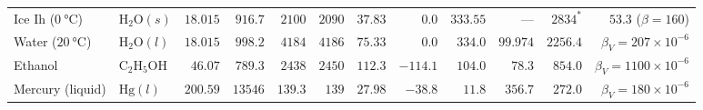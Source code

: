\documentclass[10pt,twoside,openany,letterpaper]{book}
\begin{document}
\begin{quicksheet}
\begin{formulacard}
\begin{tabularx}{\linewidth}{@{}X l r r r r r r r r r r@{}}
Ice Ih ($\SI{0}{\celsius}$) & $\mathrm{H_2O}(s)$ & $18.015$ & $916.7$ & $2100$ & $2090$ & $37.83$ & $0.0$ & $333.55$ & — & $2834^*$ & $53.3$ ($\beta=160$) \\
Water ($\SI{20}{\celsius}$) & $\mathrm{H_2O}(l)$ & $18.015$ & $998.2$ & $4184$ & $4186$ & $75.33$ & $0.0$ & $334.0$ & $99.974$ & $2256.4$ & $\beta_V = 207\times 10^{-6}$ \\
Ethanol & $\mathrm{C_2H_5OH}$ & $46.07$ & $789.3$ & $2438$ & $2450$ & $112.3$ & $-114.1$ & $104.0$ & $78.3$ & $854.0$ & $\beta_V = 1100\times 10^{-6}$ \\
Mercury (liquid) & $\mathrm{Hg}(l)$ & $200.59$ & $13546$ & $139.3$ & $139$ & $27.98$ & $-38.8$ & $11.8$ & $356.7$ & $272.0$ & $\beta_V = 180\times 10^{-6}$ \\
\bottomrule
\end{tabularx}
\end{formulacard}
\end{quicksheet}
\end{document}
